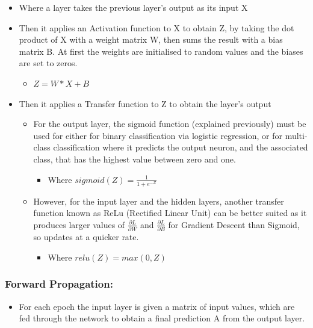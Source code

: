 \documentclass[./project-report/src/latex/project-report.tex]{subfiles}
\begin{document}
\begin{itemize}
    \item Where a layer takes the previous layer's output as its input X
    \item Then it applies an Activation function to X to obtain Z, by taking the dot product of X with a weight matrix W, then sums the result with a bias matrix B. At 
          first the weights are initialised to random values and the biases are set to zeros.
    \begin{itemize}
        \item $Z = W * X + B$
    \end{itemize}
    \item Then it applies a Transfer function to Z to obtain the layer's output
    \begin{itemize}
        \item For the output layer, the sigmoid function (explained previously) must be used for either for binary classification via logistic regression, or for multi-
              class classification where it predicts the output neuron, and the associated class, that has the highest value between zero and one.
        \begin{itemize}
            \item Where $sigmoid(Z) = \frac{1}{1+e^{-Z}}$
        \end{itemize}
        \item However, for the input layer and the hidden layers, another transfer function known as ReLu (Rectified Linear Unit) can be better suited as it produces 
              larger values of $\frac{\partial{L}}{\partial{W}}$ and $\frac{\partial{L}}{\partial{B}}$ for Gradient Descent than Sigmoid, so updates at a quicker rate.
        \begin{itemize}
            \item Where $relu(Z) = max(0, Z)$
        \end{itemize}
    \end{itemize}
\end{itemize}

\subsubsection{Forward Propagation:}

\begin{itemize}
    \item For each epoch the input layer is given a matrix of input values, which are fed through the network to obtain a final prediction A from the output layer.
\end{itemize}
\end{document}
